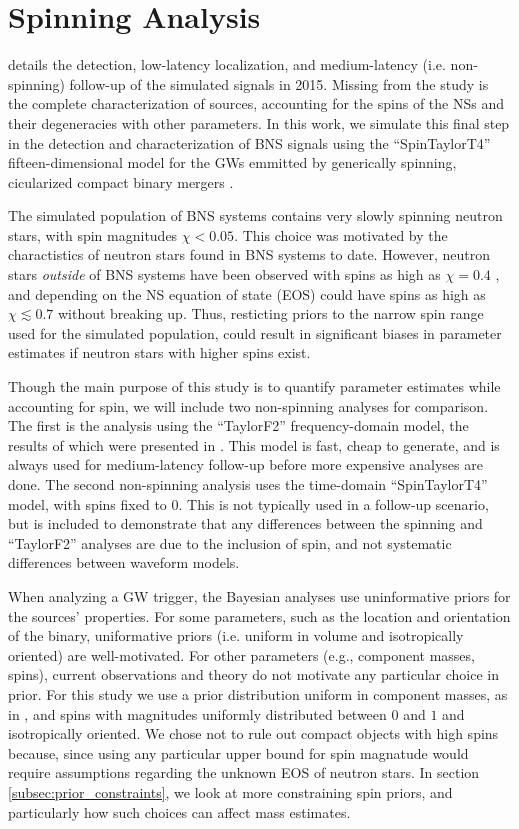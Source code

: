 \section{Spinning Analysis}
\label{sec:spin}

\citet{Singer_2014} details the detection, low-latency localization, and medium-latency (i.e. non-spinning) follow-up of the simulated signals in 2015.  Missing from the study is the complete characterization of sources, accounting for the spins of the NSs and their degeneracies with other parameters.  In this work, we simulate this final step in the detection and characterization of BNS signals using the ``SpinTaylorT4'' fifteen-dimensional model for the GWs emmitted by generically spinning, cicularized compact binary mergers \citep{Buonanno_2003,Buonanno_2009}. 

The simulated population of BNS systems contains very slowly spinning neutron stars, with spin magnitudes $\chi < 0.05$.  This choice was motivated by the charactistics of neutron stars found in BNS systems to date. However, neutron stars \emph{outside} of BNS systems have been observed with spins as high as $\chi = 0.4$ \citep{Hessels_2006,Brown_2012}, and depending on the NS equation of state (EOS) could have spins as high as $\chi \lesssim 0.7$ \citep{Lo_2011} without breaking up.  Thus, resticting priors to the narrow spin range used for the simulated population, could result in significant biases in parameter estimates if neutron stars with higher spins exist.

Though the main purpose of this study is to quantify parameter estimates while accounting for spin, we will include two non-spinning analyses for comparison.  The first is the analysis using the ``TaylorF2'' frequency-domain model, the results of which were presented in \citet{Singer_2014}.  This model is fast, cheap to generate, and is always used for medium-latency follow-up before more expensive analyses are done.  The second non-spinning analysis uses the time-domain ``SpinTaylorT4'' model, with spins fixed to $0$.  This is not typically used in a follow-up scenario, but is included to demonstrate that any differences between the spinning and ``TaylorF2'' analyses are due to the inclusion of spin, and not systematic differences between waveform models.

When analyzing a GW trigger, the Bayesian analyses use uninformative priors for the sources' properties.  For some parameters, such as the location and orientation of the binary, uniformative priors (i.e. uniform in volume and isotropically oriented) are well-motivated.  For other parameters (e.g., component masses, spins), current observations and theory do not motivate any particular choice in prior.  For this study we use a prior distribution uniform in component masses, as in \citet{2013arXiv1304.0670L}, and spins with magnitudes uniformly distributed between $0$ and $1$ and isotropically oriented.  We chose not to rule out compact objects with high spins because, since using any particular upper bound for spin magnatude would require assumptions regarding the unknown EOS of neutron stars.  In section \ref{subsec:prior_constraints}, we look at more constraining spin priors, and particularly how such choices can affect mass estimates.